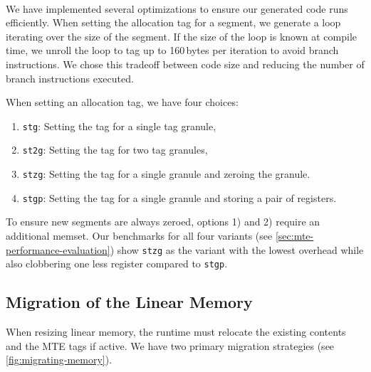 \paragraph{}
We have implemented several optimizations to ensure our generated code runs efficiently.
When setting the allocation tag for a segment, we generate a loop iterating over the size of the segment.
If the size of the loop is known at compile time, we unroll the loop to tag up to 160\,bytes per iteration to avoid branch instructions.
We chose this tradeoff between code size and reducing the number of branch instructions executed.

When setting an allocation tag, we have four choices:
\begin{enumerate}
  \item \texttt{stg}: Setting the tag for a single tag granule,
  \item \texttt{st2g}: Setting the tag for two tag granules,
  \item \texttt{stzg}: Setting the tag for a single granule and zeroing the granule.
  \item \texttt{stgp}: Setting the tag for a single granule and storing a pair of registers.
\end{enumerate}

\noindent
To ensure new segments are always zeroed, options 1) and 2) require an additional memset.
Our benchmarks for all four variants (see \cref{sec:mte-performance-evaluation}) show \texttt{stzg} as the variant with the lowest overhead while also clobbering one less register compared to \texttt{stgp}.

\subsection{Migration of the Linear Memory}
\label{subsec:migration-of-the-linear-memory}

When resizing linear memory, the runtime must relocate the existing contents and the \ac{MTE} tags if active.
We have two primary migration strategies (see \cref{fig:migrating-memory}).

